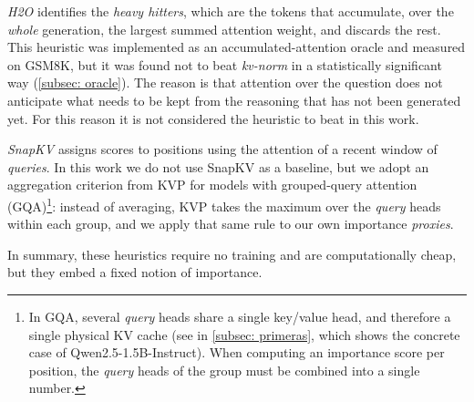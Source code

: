 \emph{H2O} \cite{zhang2023h2o} identifies the \textit{heavy hitters}, which are the tokens that accumulate, over the \emph{whole} generation, the largest summed attention weight, and discards the rest. This heuristic was implemented as an accumulated-attention oracle and measured on GSM8K, but it was found not to beat \textit{kv-norm} in a statistically significant way (\cref{subsec: oracle}). The reason is that attention over the question does not anticipate what needs to be kept from the reasoning that has not been generated yet. For this reason it is not considered the heuristic to beat in this work.

\emph{SnapKV} \cite{li2024snapkv} assigns scores to positions using the attention of a recent window of \textit{queries}. In this work we do not use SnapKV as a baseline, but we adopt an aggregation criterion from KVP for models with grouped-query attention (GQA)\footnote{In GQA, several \textit{query} heads share a single key/value head, and therefore a single physical KV cache (see  in \cref{subsec: primeras}, which shows the concrete case of Qwen2.5-1.5B-Instruct).
When computing an importance score per position, the \textit{query} heads of the group must be combined into a single number.}: instead of averaging, KVP takes the maximum over the \textit{query} heads within each group, and we apply that same rule to our own importance \textit{proxies}.

In summary, these heuristics require no training and are computationally cheap, but they embed a fixed notion of importance.
